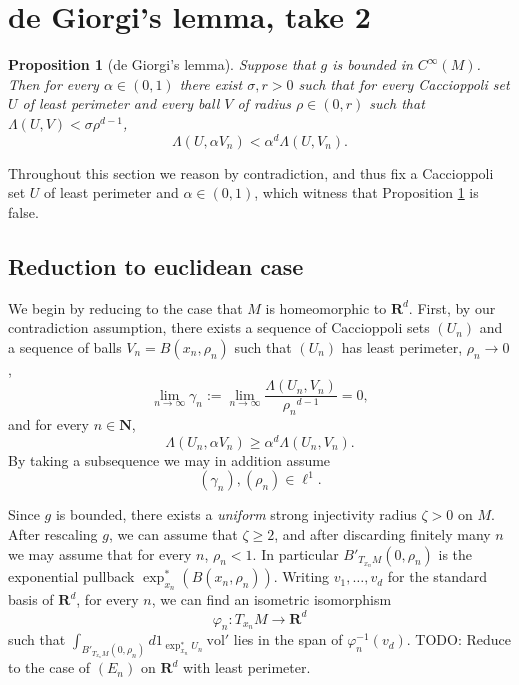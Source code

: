 \documentclass[reqno,12pt,letterpaper]{amsart}
\newcommand{\NN}{\mathbf{N}}
\newcommand{\RR}{\mathbf{R}}
\newcommand{\vol}{\mathrm{vol}}
\newtheorem{proposition}[theorem]{Proposition}
\theoremstyle{definition}
\numberwithin{equation}{section}
\begin{document}
\section{de Giorgi's lemma, take 2}
\begin{proposition}[de Giorgi's lemma]\label{DGL}
Suppose that $g$ is bounded in $C^\infty(M)$.
Then for every $\alpha \in (0, 1)$ there exist $\sigma, r > 0$ such that for every Caccioppoli set $U$ of least perimeter and every ball $V$ of radius $\rho \in (0, r)$ such that $\Lambda(U, V) < \sigma \rho^{d - 1}$,
$$\Lambda(U, \alpha V_n) < \alpha^d \Lambda(U, V_n).$$
\end{proposition}

Throughout this section we reason by contradiction, and thus fix a Caccioppoli set $U$ of least perimeter and $\alpha \in (0, 1)$, which witness that Proposition \ref{DGL} is false.

\subsection{Reduction to euclidean case}
We begin by reducing to the case that $M$ is homeomorphic to $\RR^d$.
First, by our contradiction assumption, there exists a sequence of Caccioppoli sets $(U_n)$ and a sequence of balls $V_n = B(x_n, \rho_n)$ such that $(U_n)$ has least perimeter, $\rho_n \to 0$,
\begin{equation}\label{dfn of gamma}
\lim_{n \to \infty} \gamma_n := \lim_{n \to \infty} \frac{\Lambda(U_n, V_n)}{{\rho_n}^{d - 1}} = 0,
\end{equation}
and for every $n \in \NN$,
\begin{equation}\label{contradiction DGL}
\Lambda(U_n, \alpha V_n) \geq \alpha^d \Lambda(U_n, V_n).
\end{equation}
By taking a subsequence we may in addition assume
\begin{equation}\label{summability}
(\gamma_n), (\rho_n) \in \ell^1.
\end{equation}

Since $g$ is bounded, there exists a \emph{uniform} strong injectivity radius $\zeta > 0$ on $M$.
After rescaling $g$, we can assume that $\zeta \geq 2$, and after discarding finitely many $n$ we may assume that for every $n$, $\rho_n < 1$.
In particular $B'_{T_{x_n}M}(0, \rho_n)$ is the exponential pullback $\exp_{x_n}^*(B(x_n, \rho_n))$.
Writing $v_1, \dots, v_d$ for the standard basis of $\RR^d$, for every $n$, we can find an isometric isomorphism
$$\varphi_n: T_{x_n}M \to \RR^d$$
such that $\int_{B'_{T_{x_n}M}(0, \rho_n)} d1_{\exp_{x_n}^* U_n} ~\vol'$ lies in the span of $\varphi_n^{-1}(v_d)$.
TODO: Reduce to the case of $(E_n)$ on $\RR^d$ with least perimeter.
\end{document}
